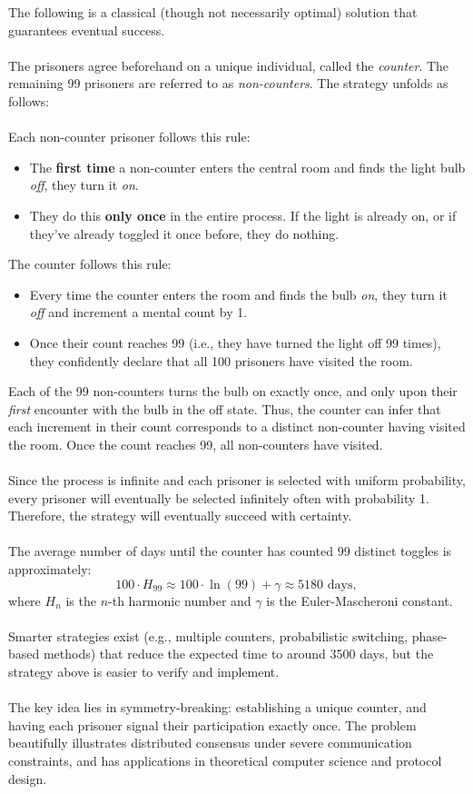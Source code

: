 \documentclass[11pt, a4paper, oneside]{article}
\theoremstyle{remark}
\theoremstyle{lemma}
\begin{document}
The following is a classical (though not necessarily optimal) solution that guarantees eventual success.
\\\\
The prisoners agree beforehand on a unique individual, called the \textit{counter}. The remaining 99 prisoners are referred to as \textit{non-counters}. The strategy unfolds as follows:
\\\\
Each non-counter prisoner follows this rule:
\begin{itemize}
    \item The \textbf{first time} a non-counter enters the central room and finds the light bulb \textit{off}, they turn it \textit{on}.
    \item They do this \textbf{only once} in the entire process. If the light is already on, or if they've already toggled it once before, they do nothing.
\end{itemize}
The counter follows this rule:
\begin{itemize}
    \item Every time the counter enters the room and finds the bulb \textit{on}, they turn it \textit{off} and increment a mental count by 1.
    \item Once their count reaches 99 (i.e., they have turned the light off 99 times), they confidently declare that all 100 prisoners have visited the room.
\end{itemize}
Each of the 99 non-counters turns the bulb on exactly once, and only upon their \textit{first} encounter with the bulb in the off state. Thus, the counter can infer that each increment in their count corresponds to a distinct non-counter having visited the room. Once the count reaches 99, all non-counters have visited.
\\\\
Since the process is infinite and each prisoner is selected with uniform probability, every prisoner will eventually be selected infinitely often with probability 1. Therefore, the strategy will eventually succeed with certainty.
\\\\
The average number of days until the counter has counted 99 distinct toggles is approximately:
\[
100 \cdot H_{99} \approx 100 \cdot \ln(99) + \gamma \approx 5180 \text{ days},
\]
where \( H_n \) is the \( n \)-th harmonic number and \( \gamma \) is the Euler-Mascheroni constant.
\\\\
Smarter strategies exist (e.g., multiple counters, probabilistic switching, phase-based methods) that reduce the expected time to around 3500 days, but the strategy above is easier to verify and implement.
\\\\
The key idea lies in symmetry-breaking: establishing a unique counter, and having each prisoner signal their participation exactly once. The problem beautifully illustrates distributed consensus under severe communication constraints, and has applications in theoretical computer science and protocol design.
\end{document}
